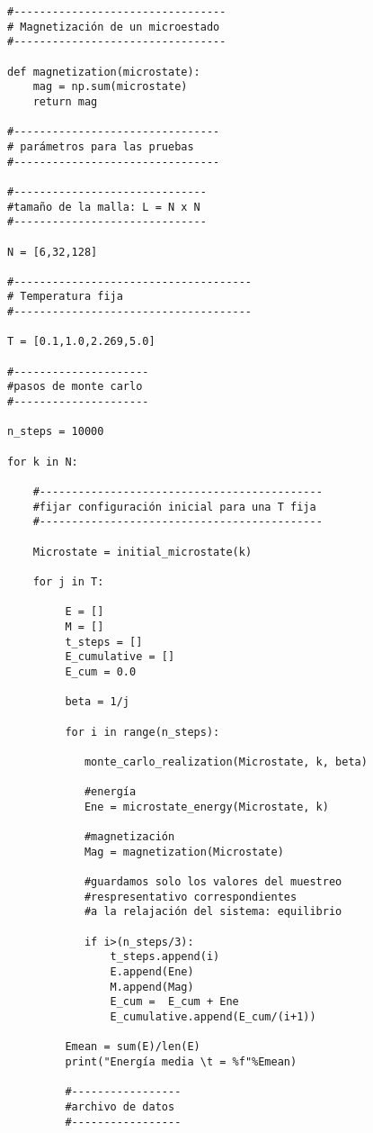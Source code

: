 \documentclass[a4paper,12pt]{article}
\begin{document}
\begin{verbatim}
#---------------------------------
# Magnetización de un microestado
#---------------------------------

def magnetization(microstate):
    mag = np.sum(microstate)
    return mag

#--------------------------------
# parámetros para las pruebas
#--------------------------------

#------------------------------
#tamaño de la malla: L = N x N
#------------------------------

N = [6,32,128]      

#-------------------------------------
# Temperatura fija
#-------------------------------------

T = [0.1,1.0,2.269,5.0]

#---------------------
#pasos de monte carlo
#---------------------

n_steps = 10000

for k in N:

    #--------------------------------------------
    #fijar configuración inicial para una T fija
    #--------------------------------------------
    
    Microstate = initial_microstate(k)

    for j in T:

         E = []
         M = []
         t_steps = []
         E_cumulative = []
         E_cum = 0.0

         beta = 1/j
        
         for i in range(n_steps):
        
            monte_carlo_realization(Microstate, k, beta)
        
            #energía
            Ene = microstate_energy(Microstate, k)
        
            #magnetización
            Mag = magnetization(Microstate) 
            
            #guardamos solo los valores del muestreo 
            #respresentativo correspondientes 
            #a la relajación del sistema: equilibrio
             
            if i>(n_steps/3):
                t_steps.append(i)
                E.append(Ene)
                M.append(Mag)
                E_cum =  E_cum + Ene
                E_cumulative.append(E_cum/(i+1))

         Emean = sum(E)/len(E)       
         print("Energía media \t = %f"%Emean)
                
         #-----------------        
         #archivo de datos
         #-----------------
                

\end{verbatim}
\end{document}
